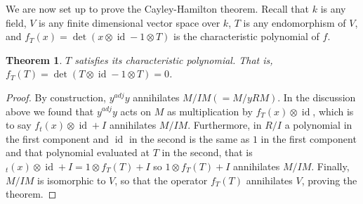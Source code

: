 \documentclass[18pt]{amsart}
\newtheorem{thm}{Theorem}
\newcommand{\id}{\operatorname{id}}
\begin{document}
	We are now set up to prove the Cayley-Hamilton theorem. Recall that $k$ is any field, $V$ is any finite dimensional vector space over $k$, $T$ is any endomorphism of $V$, and $f_T(x)=\det(x\otimes \id - 1\otimes T)$ is the characteristic polynomial of $f$.
\begin{thm}  $T$ satisfies its characteristic polynomial. That is, $f_T (T) = \det(T \otimes \id - 1 \otimes T)=0$. \end{thm}
	\begin{proof}
		By construction, $y^{adj}y$ annihilates $M/IM(=M/yRM)$. In the discussion above we found that $y^{adj}y$ acts on $M$ as multiplication by $f_T(x) \otimes \id$, which is to say $f_t(x)\otimes \id+I$ annihilates $M/IM$. Furthermore, in $R/I$ a polynomial in the first component and $\id$ in the second is the same as $1$ in the first component and that polynomial evaluated at $T$ in the second, that is $_t(x)\otimes \id+I=1\otimes f_T(T)+I$ so $1\otimes f_T(T)+I$ annihilates $M/IM$. Finally, $M/IM$ is isomorphic to $V$, so that the operator $f_T(T)$ annihilates $V$, proving the theorem. 
	\end{proof}
\end{document}
